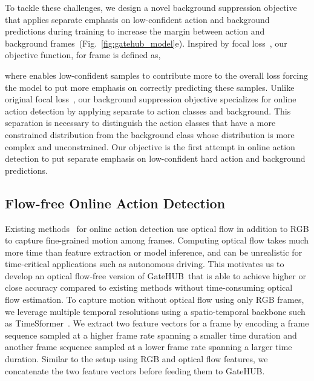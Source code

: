 \documentclass[10pt,twocolumn,letterpaper]{article}
\newcommand{\methodname}{GateHUB}
\begin{document}
To tackle these challenges, we design a novel background suppression objective that applies separate emphasis on low-confident action and background predictions during training to increase the margin between action and background frames~(Fig.~\ref{fig:gatehub_model}e). Inspired by focal loss~\cite{lin2017focal}, our objective function,  for frame  is defined as,

where  enables low-confident samples to contribute more to the overall loss forcing the model to put more emphasis on correctly predicting these samples. Unlike original focal loss~\cite{lin2017focal}, our background suppression objective specializes for online action detection by applying separate  to action classes and background. This separation is necessary to distinguish the action classes that have a more constrained distribution from the background class whose distribution is more complex and unconstrained. Our objective is the first attempt in online action detection to put separate emphasis on low-confident hard action and background predictions. 








  


\subsection{Flow-free Online Action Detection}
Existing methods~\cite{xu2019temporal, wang2021oadtr, eun2020learning} for online action detection use optical flow in addition to RGB to capture fine-grained motion among frames. Computing optical flow takes much more time than feature extraction or model inference, and can be unrealistic for time-critical applications such as autonomous driving. This motivates us to develop an optical flow-free version of \methodname~that is able to achieve higher or close accuracy compared to existing methods without time-consuming optical flow estimation.
To capture motion without optical flow using only RGB frames, we leverage multiple temporal resolutions 
using a spatio-temporal backbone such as TimeSformer~\cite{bertasius2021space}. We extract two feature vectors for a frame  by encoding a frame sequence sampled at a higher frame rate spanning a smaller time duration and another frame sequence sampled at a lower frame rate spanning a larger time duration. Similar to the setup using RGB and optical flow features, we concatenate the two feature vectors before feeding them to \methodname.
\end{document}
